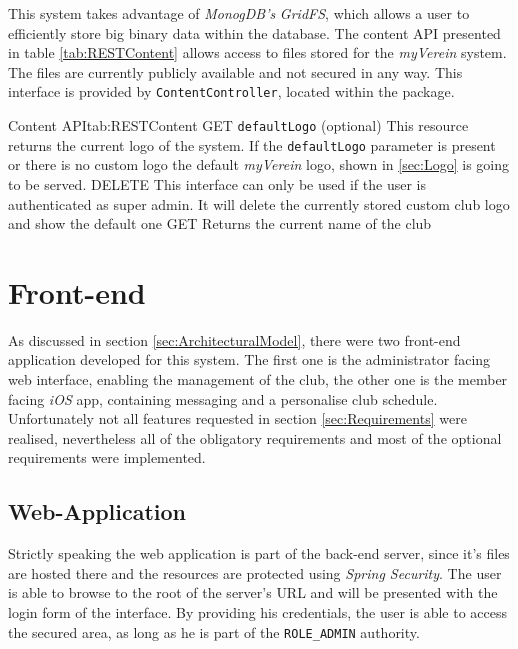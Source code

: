 This system takes advantage of \emph{MonogDB's} \emph{GridFS}, which allows a user to efficiently store big binary data within the database. The content \gls{API} presented in table \vref{tab:RESTContent} allows access to files stored for the \emph{myVerein} system. The files are currently publicly available and not secured in any way. This interface is provided by \texttt{ContentController}, located within the  package.

\begin{RESTTable}{Content API}{tab:RESTContent}
		{GET}
		{\texttt{defaultLogo} (optional)}
		{This resource returns the current logo of the system. If the \texttt{defaultLogo} parameter is present or there is no custom logo the default \emph{myVerein} logo, shown in \vref{sec:Logo} is going to be served.}
		{DELETE}
		{}
		{This interface can only be used if the user is authenticated as super admin. It will delete the currently stored custom club logo and show the default one}
		{GET}
		{}
		{Returns the current name of the club}
\end{RESTTable}

\section{Front-end}
\label{sec:FrontEnd}

As discussed in section \vref{sec:ArchitecturalModel}, there were two front-end application developed for this system. The first one is the administrator facing web interface, enabling the management of the club, the other one is the member facing \emph{iOS} app, containing messaging and a personalise club schedule. Unfortunately not all features requested in section \vref{sec:Requirements} were realised, nevertheless all of the obligatory requirements and most of the optional requirements were implemented.

\subsection{Web-Application}

Strictly speaking the web application is part of the back-end server, since it's files are hosted there and the resources are protected using \emph{Spring Security}. The user is able to browse to the root of the server's \gls{URL} and will be presented with the login form of the interface. By providing his credentials, the user is able to access the secured area, as long as he is part of the \texttt{ROLE\_ADMIN} authority.

